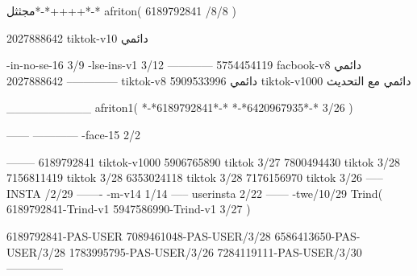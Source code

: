 مجثثل*-*++++*-*
afriton(
6189792841 /8/8
)

2027888642 tiktok-v10
دائمي

-in-no-se-16 3/9
-lse-ins-v1 3/12
------------
5754454119 facbook-v8
دائمي
--------------
2027888642 tiktok-v8
دائمي
5909533996 tiktok-v1000
دائمي مع التحديث

__________
afriton1(
*-*6189792841*-*
*-*6420967935*-* 3/26
)


------
------------
-face-15 2/2

--------
6189792841 tiktok-v1000
5906765890 tiktok 3/27
7800494430 tiktok 3/28
7156811419 tiktok 3/28
6353024118 tiktok 3/28
7176156970 tiktok 3/26
-----
 INSTA /2/29
-------
-m-v14 1/14
-----
userinsta 2/22
------
-twe/10/29
Trind(
6189792841-Trind-v1 
5947586990-Trind-v1 3/27
)

6189792841-PAS-USER
7089461048-PAS-USER/3/28
6586413650-PAS-USER/3/28
1783995795-PAS-USER/3/26
7284119111-PAS-USER/3/30
    ---------------

